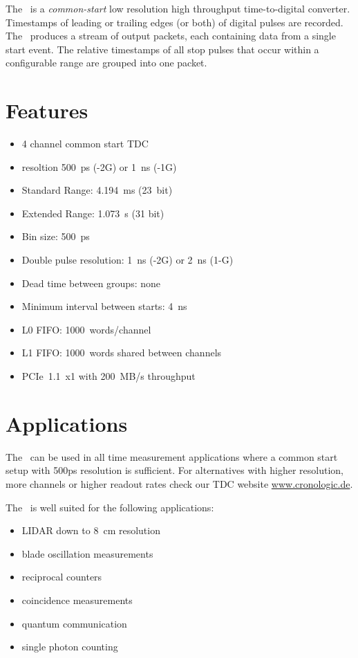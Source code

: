 The \deviceName\ is a \emph{common-start} low resolution high throughput time-to-digital converter. 
Timestamps of leading or trailing edges (or both) of digital pulses are recorded. 
The \deviceName\ produces a stream of output packets, each containing data from a single start event. 
The relative timestamps of all stop pulses that occur within a configurable range are grouped into one packet.

\section{Features}
	\begin{itemize}
		\item 4 channel common start TDC
		\item resoltion 500~ps (-2G) or 1~ns (-1G)
		\item Standard Range: 4.194~ms (23~bit)
		\item Extended Range: 1.073~s (31 bit)
		\item Bin size: 500~ps
		\item Double pulse resolution: 1~ns (-2G) or 2~ns (1-G)
		\item Dead time between groups: none
		\item Minimum interval between starts: 4~ns
		\item L0 FIFO: 1000~words/channel
		\item L1 FIFO: 1000~words shared between channels
		\item PCIe~1.1~x1 with 200~MB/s throughput
	\end{itemize} 

\section{Applications}
	The \deviceName\  can be used in all time measurement applications where a common start setup with 500ps resolution is sufficient. 
	For alternatives with higher resolution, more channels or higher readout rates check our TDC website \href{https://www.cronologic.de/produkte/products-overview#tdcdata}{www.cronologic.de}.

	The \deviceName\ is well suited for the following applications:
	\begin{itemize}
		\item LIDAR down to 8~cm resolution
		\item blade oscillation measurements
		\item reciprocal counters
		\item coincidence measurements
		\item quantum communication
		\item single photon counting
	\end{itemize} 
